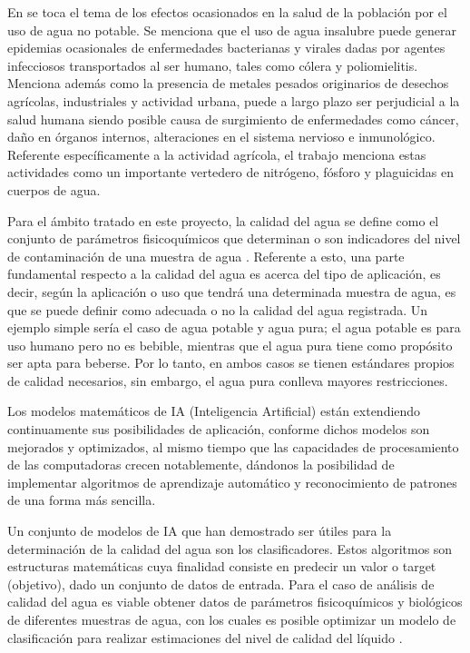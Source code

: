 En \cite{cantonEcuador} se toca el tema de los efectos ocasionados en la salud de la población por el uso de agua no potable. Se menciona que el uso de agua insalubre puede generar epidemias ocasionales de enfermedades bacterianas 
y virales dadas por agentes infecciosos transportados al ser humano, tales como cólera y poliomielitis. Menciona además como la presencia de metales pesados originarios de desechos agrícolas, industriales y actividad urbana, 
puede a largo plazo ser perjudicial a la salud humana siendo posible causa de surgimiento de enfermedades como cáncer, daño en órganos internos, alteraciones en el sistema nervioso e inmunológico. Referente específicamente 
a la actividad agrícola, el trabajo \cite{rio_Cunas} menciona estas actividades como un importante vertedero de nitrógeno, fósforo y plaguicidas en cuerpos de agua.

Para el ámbito tratado en este proyecto, la calidad del agua se define como el conjunto de parámetros
fisicoquímicos que determinan o son indicadores del nivel de contaminación de una muestra de agua \cite{zhang_characterization_2015}. Referente a esto, una parte fundamental respecto a la calidad del agua es acerca del tipo 
de aplicación, es decir, según la aplicación o uso que tendrá una determinada muestra de agua, es que se puede definir como adecuada o no la calidad del agua registrada. Un ejemplo simple sería el caso de agua potable y agua 
pura; el agua potable es para uso humano pero no es bebible, mientras que el agua pura tiene como propósito ser apta para beberse. Por lo tanto, en ambos casos se tienen estándares propios de calidad necesarios, sin embargo,
el agua pura conlleva mayores restricciones.

Los modelos matemáticos de IA (Inteligencia Artificial) están extendiendo continuamente sus 
posibilidades de aplicación, conforme dichos modelos son mejorados y optimizados, al mismo tiempo que las capacidades
de procesamiento de las computadoras crecen notablemente, dándonos la posibilidad de implementar algoritmos 
de aprendizaje automático y reconocimiento de patrones de una forma más sencilla.

Un conjunto de modelos de IA que han demostrado ser útiles para la determinación de la calidad del agua son los clasificadores. 
Estos algoritmos son estructuras matemáticas cuya finalidad consiste en predecir un valor o target (objetivo),
dado un conjunto de datos de entrada. Para el caso de análisis de calidad del agua es viable obtener datos de parámetros fisicoquímicos y biológicos de diferentes muestras de agua, con los cuales es posible optimizar un 
modelo de clasificación para realizar estimaciones del nivel de calidad del líquido \cite{barzegar_short-term_2020}.

